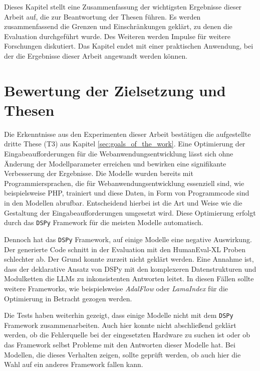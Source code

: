 Dieses Kapitel stellt eine Zusammenfassung der wichtigsten Ergebnisse dieser Arbeit auf, die zur Beantwortung der Thesen führen. Es werden zusammenfassend die Grenzen und Einschränkungen geklärt, zu denen die Evaluation durchgeführt wurde. Des Weiteren werden Impulse für weitere Forschungen diskutiert. Das Kapitel endet mit einer praktischen Anwendung, bei der die Ergebnisse dieser Arbeit angewandt werden können.


\section{Bewertung der Zielsetzung und Thesen}
Die Erkenntnisse aus den Experimenten dieser Arbeit bestätigen die aufgestellte dritte These (T3) aus Kapitel \ref{sec:goals_of_the_work}. Eine Optimierung der Eingabeaufforderungen für die Webanwendungsentwicklung lässt sich ohne Änderung der Modellparameter erreichen und bewirken eine signifikante Verbesserung der Ergebnisse. Die Modelle wurden bereits mit Programmiersprachen, die für Webanwendungsentwicklung essenziell sind, wie beispielsweise PHP, trainiert und diese Daten, in Form von Programmcode sind in den Modellen abrufbar. Entscheidend hierbei ist die Art und Weise wie die Gestaltung der Eingabeaufforderungen umgesetzt wird. Diese Optimierung erfolgt durch das \texttt{DSPy} Framework für die meisten Modelle automatisch.\vspace{0.2cm}

Dennoch hat das \texttt{DSPy} Framework, auf einige Modelle eine negative Auswirkung. Der generierte Code schnitt in der Evaluation mit den HumanEval-XL Proben schlechter ab. Der Grund konnte zurzeit nicht geklärt werden. Eine Annahme ist, dass der deklarative Ansatz von DSPy mit den komplexeren Datenstrukturen und Modulketten die LLMs zu inkonsistenten Antworten leitet. In diesen Fällen sollte weitere Frameworks, wie beispielsweise \textit{AdalFlow} oder \textit{LamaIndex} für die Optimierung in Betracht gezogen werden.\vspace{0.2cm}

Die Tests haben weiterhin gezeigt, dass einige Modelle nicht mit dem \texttt{DSPy} Framework zusammenarbeiten. Auch hier konnte nicht abschließend geklärt werden, ob die Fehlerquelle bei der eingesetzten Hardware zu suchen ist oder ob das Framework selbst Probleme mit den Antworten dieser Modelle hat. Bei Modellen, die dieses Verhalten zeigen, sollte geprüft werden, ob auch hier die Wahl auf ein anderes Framework fallen kann.\vspace{0.2cm}

